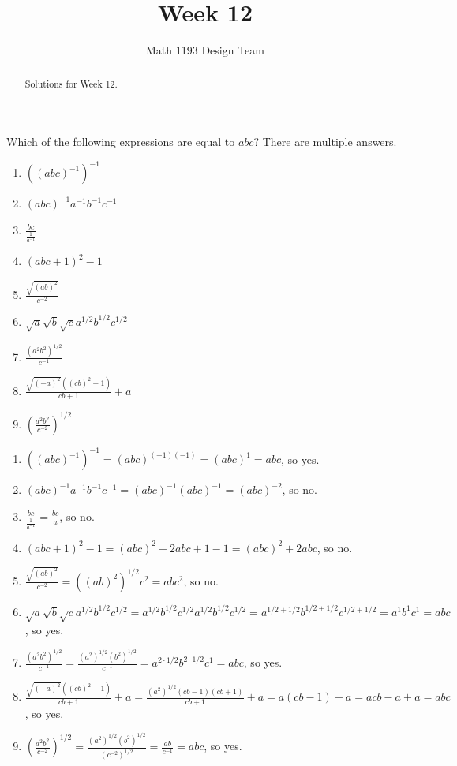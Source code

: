 \documentclass[noauthor]{ximera}
\title{Week 12}
\author{Math 1193 Design Team}
\begin{document}
\begin{abstract}
    Solutions for Week 12.
\end{abstract}
\maketitle
 
\begin{problem}
Which of the following expressions are equal to \(abc\)? There are multiple
answers.
\begin{enumerate}
    \item \(\left((abc)^{-1}\right)^{-1}\)
    \item \((abc)^{-1}a^{-1}b^{-1}c^{-1}\)
    \item \(\frac{bc}{\frac{1}{a^{-1}}}\)
    \item \((abc + 1)^2 - 1\)
    \item \(\frac{\sqrt{(ab)^2}}{c^{-2}}\)
    \item \(\sqrt{a}\sqrt{b}\sqrt{c}a^{1/2}b^{1/2}c^{1/2}\)
    \item \(\frac{(a^{2}b^{2})^{1/2}}{c^{-1}}\)
    \item \(\frac{\sqrt{(-a)^2}((cb)^2 - 1)}{cb + 1} + a\)
    \item \(\left(\frac{a^2b^2}{c^{-2}}\right)^{1/2}\)
\end{enumerate}
\begin{explanation}
\begin{enumerate}
    \item \(\left((abc)^{-1}\right)^{-1} = (abc)^{(-1)(-1)} = (abc)^1 = abc\), so yes.
    \item \((abc)^{-1}a^{-1}b^{-1}c^{-1} = (abc)^{-1}(abc)^{-1} = (abc)^{-2}\), so no.
    \item \(\frac{bc}{\frac{1}{a^{-1}}} = \frac{bc}{a}\), so no.
    \item \((abc + 1)^2 - 1 = (abc)^2 + 2abc + 1 - 1 = (abc)^2 + 2abc\), so no.
    \item \(\frac{\sqrt{(ab)^2}}{c^{-2}} = ((ab)^2)^{1/2}c^2 = abc^2\), so no.
    \item \(\sqrt{a}\sqrt{b}\sqrt{c}a^{1/2}b^{1/2}c^{1/2} = a^{1/2}b^{1/2}c^{1/2}a^{1/2}b^{1/2}c^{1/2} = a^{1/2 + 1/2}b^{1/2 + 1/2}c^{1/2 + 1/2} = a^1b^1c^1 = abc\), so yes.
    \item \(\frac{(a^{2}b^{2})^{1/2}}{c^{-1}} = \frac{(a^2)^{1/2}(b^2)^{1/2}}{c^{-1}} = a^{2 \cdot 1/2}b^{2 \cdot 1/2}c^1 = abc\), so yes.
    \item \(\frac{\sqrt{(-a)^2}((cb)^2 - 1)}{cb + 1} + a = \frac{(a^2)^{1/2}(cb - 1)(cb + 1)}{cb + 1} + a = a(cb - 1) + a = acb - a + a = abc\), so yes.
    \item \(\left(\frac{a^2b^2}{c^{-2}}\right)^{1/2} = \frac{(a^2)^{1/2}(b^2)^{1/2}}{(c^{-2})^{1/2}} = \frac{ab}{c^{-1}} = abc\), so yes.
\end{enumerate}
\end{explanation}
\end{problem}
 
\end{document}
